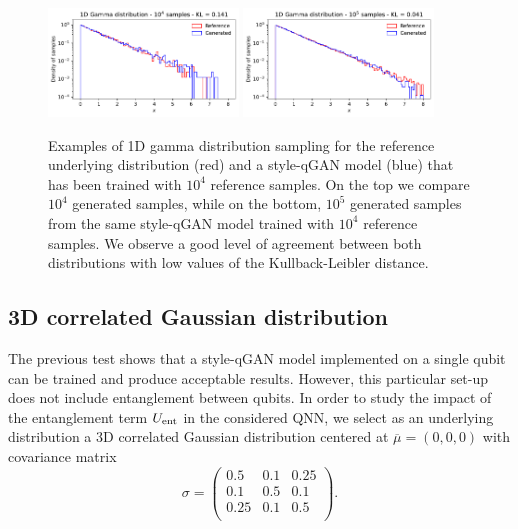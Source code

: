 \documentclass[twocolumn,preprintnumbers,superscriptaddress]{revtex4-2}
\begin{document}
\begin{figure}
  \includegraphics[width=0.45\textwidth]{plots/1Dgamma/1Dgamma_distribution_10k.pdf}
  \includegraphics[width=0.45\textwidth]{plots/1Dgamma/1Dgamma_distribution_100k.pdf}
  \caption{\label{fig:gamma} Examples of 1D gamma distribution sampling for the
  reference underlying distribution (red) and a style-qGAN model (blue) that has been
  trained with $10^4$ reference samples. On the top we compare $10^4$ generated samples, while
  on the bottom, $10^5$ generated samples from the same style-qGAN model
  trained with $10^4$ reference samples. We observe a good level of agreement between both
  distributions with low values of the Kullback-Leibler distance.}
\end{figure}

\subsection{3D correlated Gaussian distribution}

The previous test shows that a style-qGAN model implemented on a single qubit can be
trained and produce acceptable results. However, this particular set-up does not
include entanglement between qubits. In order to study the impact of the
entanglement term $U_{\rm ent}$ in the considered QNN, we select as an
underlying distribution a 3D correlated Gaussian distribution centered at
$\overline{\mu}=(0,0,0)$ with covariance matrix
\begin{equation}
  \sigma =
\begin{pmatrix}
  0.5 & 0.1 & 0.25\\
  0.1 & 0.5 & 0.1\\
  0.25 & 0.1 & 0.5\\
  \end{pmatrix}.
\end{equation}
\end{document}
